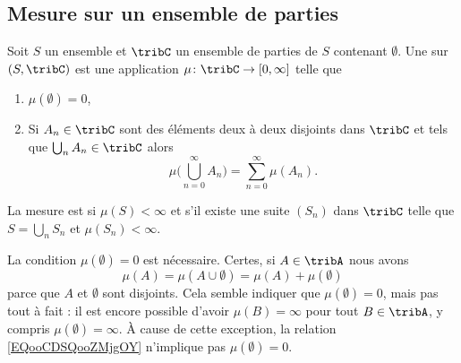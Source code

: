 \subsection{Mesure sur un ensemble de parties}

\begin{definition}       \label{DefWUPHooEklLmR}
    Soit \( S\) un ensemble et \( \tribC\) un ensemble de parties de \( S\) contenant \( \emptyset\). Une  sur \( (S,\tribC)\) est une application \( \mu\colon \tribC\to \mathopen[ 0 , \infty \mathclose]\) telle que
    \begin{enumerate}
        \item
            \( \mu(\emptyset)=0\),
        \item
            Si \( A_n\in\tribC\) sont des éléments deux à deux disjoints dans \( \tribC\) et tels que \( \bigcup_nA_n\in\tribC\) alors
            \begin{equation}
                \mu\big( \bigcup_{n=0}^{\infty}A_n \big)=\sum_{n=0}^{\infty}\mu(A_n).
            \end{equation}
    \end{enumerate}

    La mesure est  si \( \mu(S)<\infty\) et  s'il existe une suite \( (S_n)\) dans \( \tribC\) telle que \( S=\bigcup_nS_n\) et \( \mu(S_n)<\infty\).
\end{definition}

\begin{remark}
    La condition \( \mu(\emptyset)=0\) est nécessaire. Certes, si \( A\in \tribA\) nous avons
    \begin{equation}        \label{EQooCDSQooZMjgOY}
        \mu(A)=\mu(A\cup \emptyset)=\mu(A)+\mu(\emptyset)
    \end{equation}
    parce que \( A\) et \( \emptyset\) sont disjoints. Cela semble indiquer que \( \mu(\emptyset)=0\), mais pas tout à fait : il est encore possible d'avoir \( \mu(B)=\infty\) pour tout \( B\in\tribA\), y compris \( \mu(\emptyset)=\infty\). À cause de cette exception, la relation \eqref{EQooCDSQooZMjgOY} n'implique pas \( \mu(\emptyset)=0\).
\end{remark}

